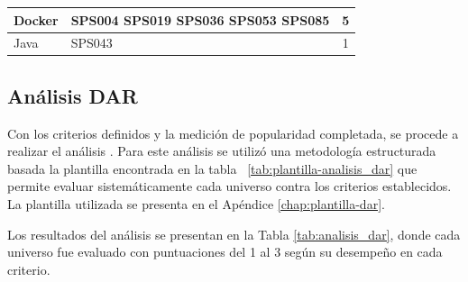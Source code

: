 \begin{table}[H]
\begin{tabular}{|l|p{8cm}|c|}
		\hline
		Docker            & \tiny{SPS004 SPS019 SPS036 SPS053 SPS085}                                                                                                                                                                                                                                                                                                                                                        & 5                          \\
		\hline
		Java              & \tiny{SPS043}                                                                                                                                                                                                                                                                                                                                                                                    & 1                          \\
		\hline
	\end{tabular}
\end{table}

\subsection{Análisis DAR}
Con los criterios definidos y la medición de popularidad completada, se procede a realizar el análisis \DAR. Para este análisis se utilizó una metodología estructurada basada la plantilla encontrada en la tabla ~\ref{tab:plantilla-analisis_dar} que permite evaluar sistemáticamente cada universo contra los criterios establecidos. La plantilla utilizada se presenta en el Apéndice \ref{chap:plantilla-dar}.

Los resultados del análisis se presentan en la Tabla \ref{tab:analisis_dar}, donde cada universo fue evaluado con puntuaciones del 1 al 3 según su desempeño en cada criterio.

